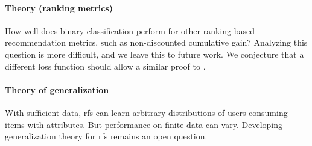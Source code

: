 \paragraph{Theory (ranking metrics)} How well does binary classification perform
for other ranking-based recommendation metrics, such as non-discounted
cumulative gain? Analyzing this question is more difficult, and we leave this to
future work. We conjecture that a different loss function should allow a similar
proof to .

\paragraph{Theory of generalization} With sufficient data, \acrlong{rfs} can
learn arbitrary distributions of users consuming items with attributes. But
performance on finite data can vary. Developing generalization theory for
\acrlong{rfs} remains an open question.


